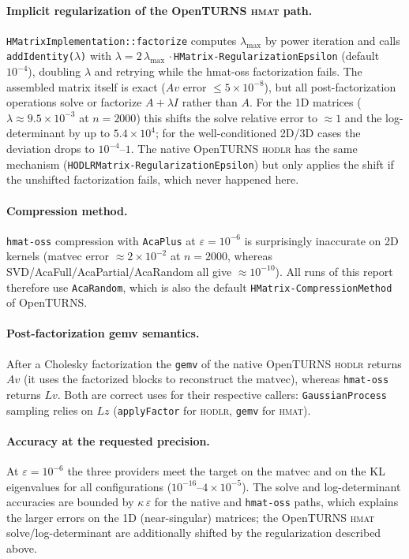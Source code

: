 \documentclass[11pt]{article}
\newcommand{\ot}{OpenTURNS}
\begin{document}
\paragraph{Implicit regularization of the \ot{} \textsc{hmat} path.}
\texttt{HMatrixImplementation::factorize} computes $\lambda_{\max}$ by power
iteration and calls \texttt{addIdentity($\lambda$)} with
$\lambda = 2\,\lambda_{\max}\,\cdot$\texttt{HMatrix-RegularizationEpsilon}
(default $10^{-4}$), doubling $\lambda$ and retrying while the hmat-oss
factorization fails.  The assembled matrix itself is exact ($A v$ error
$\le 5\times10^{-8}$), but all post-factorization operations solve or
factorize $A+\lambda I$ rather than $A$.  For the 1D matrices ($\lambda \approx
9.5\times10^{-3}$ at $n=2000$) this shifts the solve relative error to
$\approx 1$ and the log-determinant by up to $5.4\times10^{4}$; for the
well-conditioned 2D/3D cases the deviation drops to $10^{-4}$--$1$.  The native
\ot{} \textsc{hodlr} has the same mechanism
(\texttt{HODLRMatrix-RegularizationEpsilon}) but only applies the shift if the
unshifted factorization fails, which never happened here.

\paragraph{Compression method.}
\texttt{hmat-oss} compression with \texttt{AcaPlus} at $\varepsilon=10^{-6}$ is
surprisingly inaccurate on 2D kernels (matvec error $\approx 2\times10^{-2}$ at
$n=2000$, whereas SVD/AcaFull/AcaPartial/AcaRandom all give $\approx
10^{-10}$).  All runs of this report therefore use \texttt{AcaRandom}, which is
also the default \texttt{HMatrix-CompressionMethod} of \ot{}.

\paragraph{Post-factorization gemv semantics.}
After a Cholesky factorization the \texttt{gemv} of the native \ot{}
\textsc{hodlr} returns $A v$ (it uses the factorized blocks to reconstruct the
matvec), whereas \texttt{hmat-oss} returns $L v$.  Both are correct uses for
their respective callers: \texttt{GaussianProcess} sampling relies on
$L z$ (\texttt{applyFactor} for \textsc{hodlr}, \texttt{gemv} for
\textsc{hmat}).

\paragraph{Accuracy at the requested precision.}
At $\varepsilon=10^{-6}$ the three providers meet the target on the matvec and
on the KL eigenvalues for all configurations ($10^{-16}$--$4\times10^{-5}$).
The solve and log-determinant accuracies are bounded by $\kappa\,\varepsilon$
for the native and \texttt{hmat-oss} paths, which explains the larger errors on
the 1D (near-singular) matrices; the \ot{} \textsc{hmat} solve/log-determinant
are additionally shifted by the regularization described above.
\end{document}
